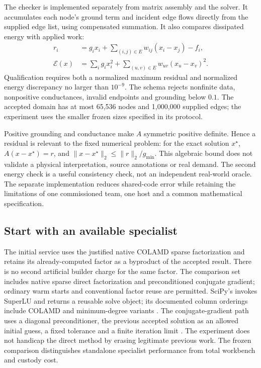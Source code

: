 The checker is implemented separately from matrix assembly and the solver. It accumulates each node's
ground term and incident edge flows directly from the supplied edge list, using compensated summation.
It also compares dissipated energy with applied work:
\begin{align}
 r_i &=g_i x_i+\sum_{(i,j)\in E} w_{ij}(x_i-x_j)-f_i,\\
 \mathcal E(x)&=\sum_i g_i x_i^2+\sum_{(u,v)\in E}w_{uv}(x_u-x_v)^2.
\end{align}
Qualification requires both a normalized maximum residual and normalized energy discrepancy no larger
than $10^{-9}$. The schema rejects nonfinite data, nonpositive conductances, invalid endpoints and grounding
below $0.1$. The accepted domain has at most 65,536 nodes and 1,000,000 supplied edges; the experiment uses
the smaller frozen sizes specified in its protocol.

Positive grounding and conductance make $A$ symmetric positive definite. Hence a residual is relevant to
the fixed numerical problem: for the exact solution $x^\star$, $A(x-x^\star)=r$, and
$\|x-x^\star\|_2\leq\|r\|_2/g_{\min}$. This algebraic bound does not validate a physical interpretation,
source annotations or real demand. The second energy check is a useful consistency check, not an independent
real-world oracle. The separate implementation reduces shared-code error while retaining the limitations of
one commissioned team, one host and a common mathematical specification.

\subsection{Start with an available specialist}

The initial service uses the justified native COLAMD sparse factorization and retains its already-computed
factor as a byproduct of the accepted result. There is no second artificial builder charge for the same factor.
The comparison set includes native sparse direct factorization and preconditioned conjugate gradient;
ordinary warm starts and conventional factor reuse are permitted. SciPy's  invokes SuperLU
and returns a reusable solve object; its documented column orderings include COLAMD and minimum-degree
variants \citep{scipy117splu}. The conjugate-gradient path uses a diagonal preconditioner, the previous
accepted solution as an allowed initial guess, a fixed tolerance and a finite iteration limit
\citep{scipy117cg}. The experiment does not handicap the direct method by erasing legitimate previous work.
The frozen comparison distinguishes standalone specialist performance from total workbench and custody cost.

